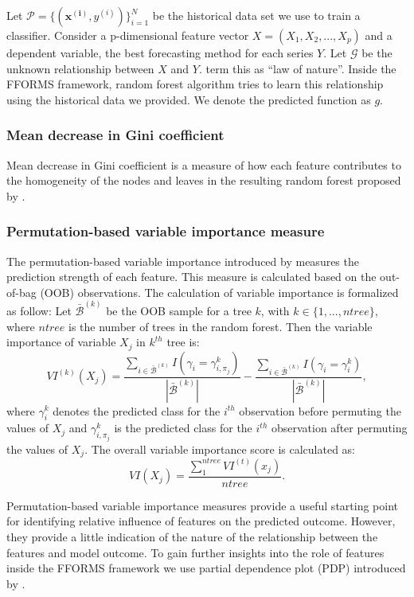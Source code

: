 \documentclass[11pt,a4paper,]{article}
\begin{document}
Let \(\mathcal{P}=\{(\mathbf{x^{(i)}}, y^{(i)})\}_{i=1}^{N}\) be the
historical data set we use to train a classifier. Consider a
p-dimensional feature vector \(X=(X_1, X_2, ..., X_p)\) and a dependent
variable, the best forecasting method for each series \(Y\). Let
\(\mathcal{G}\) be the unknown relationship between \(X\) and \(Y\).
\textcite{Zhao} term this as ``law of nature''. Inside the FFORMS
framework, random forest algorithm tries to learn this relationship
using the historical data we provided. We denote the predicted function
as \(g\).

\subsubsection{Mean decrease in Gini
coefficient}\label{mean-decrease-in-gini-coefficient}

Mean decrease in Gini coefficient is a measure of how each feature
contributes to the homogeneity of the nodes and leaves in the resulting
random forest proposed by \textcite{breiman2001random}.

\subsubsection{Permutation-based variable importance
measure}\label{permutation-based-variable-importance-measure}

The permutation-based variable importance introduced by
\textcite{breiman2001random} measures the prediction strength of each
feature. This measure is calculated based on the out-of-bag (OOB)
observations. The calculation of variable importance is formalized as
follow: Let \(\bar{\mathcal{B}}^{(k)}\) be the OOB sample for a tree
\(k\), with \(k\in \{1,...,ntree\}\), where \(ntree\) is the number of
trees in the random forest. Then the variable importance of variable
\(X_{j}\) in \(k^{th}\) tree is:
\[VI^{(k)}(X_{j})=\frac{\sum_{i\in \bar{\mathcal{B}}^{(k)}}I(\gamma_{i}=\gamma_{i,\pi_{j}}^{k})}{|\bar{\mathcal{B}}^{(k)}|}-\frac{\sum_{i\in \bar{\mathcal{B}}^{(k)}}I(\gamma_{i}=\gamma_{i}^{k})}{|\bar{\mathcal{B}}^{(k)}|},\]
where \(\gamma_{i}^{k}\) denotes the predicted class for the \(i^{th}\)
observation before permuting the values of \(X_{j}\) and
\(\gamma_{i, \pi_{j}}^{k}\) is the predicted class for the \(i^{th}\)
observation after permuting the values of \(X_{j}\). The overall
variable importance score is calculated as:
\[VI(X_{j})=\frac{\sum_{1}^{ntree}VI^{(t)}(x_{j})}{ntree}.\]

Permutation-based variable importance measures provide a useful starting
point for identifying relative influence of features on the predicted
outcome. However, they provide a little indication of the nature of the
relationship between the features and model outcome. To gain further
insights into the role of features inside the FFORMS framework we use
partial dependence plot (PDP) introduced by
\textcite{friedman2008predictive}.
\end{document}
